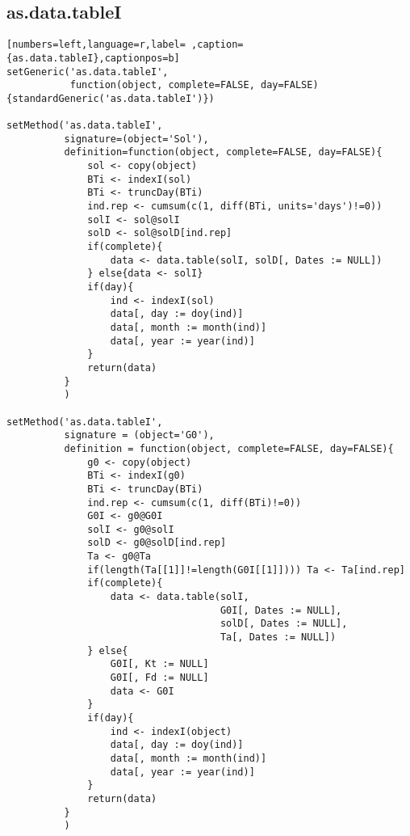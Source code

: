 \subsection{as.data.tableI}
\label{sec:orga86f91f}
\label{subsec:as.data.tablei}
\begin{lstlisting}[numbers=left,language=r,label= ,caption={as.data.tableI},captionpos=b]
setGeneric('as.data.tableI',
           function(object, complete=FALSE, day=FALSE){standardGeneric('as.data.tableI')})

setMethod('as.data.tableI',
          signature=(object='Sol'),
          definition=function(object, complete=FALSE, day=FALSE){
              sol <- copy(object)
              BTi <- indexI(sol)
              BTi <- truncDay(BTi)
              ind.rep <- cumsum(c(1, diff(BTi, units='days')!=0))
              solI <- sol@solI
              solD <- sol@solD[ind.rep]
              if(complete){
                  data <- data.table(solI, solD[, Dates := NULL])
              } else{data <- solI}
              if(day){
                  ind <- indexI(sol)
                  data[, day := doy(ind)]
                  data[, month := month(ind)]
                  data[, year := year(ind)]
              }
              return(data)
          }
          )

setMethod('as.data.tableI',
          signature = (object='G0'),
          definition = function(object, complete=FALSE, day=FALSE){
              g0 <- copy(object)
              BTi <- indexI(g0)
              BTi <- truncDay(BTi)
              ind.rep <- cumsum(c(1, diff(BTi)!=0))
              G0I <- g0@G0I
              solI <- g0@solI
              solD <- g0@solD[ind.rep]
              Ta <- g0@Ta
              if(length(Ta[[1]]!=length(G0I[[1]]))) Ta <- Ta[ind.rep]
              if(complete){
                  data <- data.table(solI,
                                     G0I[, Dates := NULL],
                                     solD[, Dates := NULL],
                                     Ta[, Dates := NULL])
              } else{    
                  G0I[, Kt := NULL]
                  G0I[, Fd := NULL]
                  data <- G0I
              }
              if(day){
                  ind <- indexI(object)
                  data[, day := doy(ind)]
                  data[, month := month(ind)]
                  data[, year := year(ind)]
              }
              return(data)
          }
          )


\end{lstlisting}
